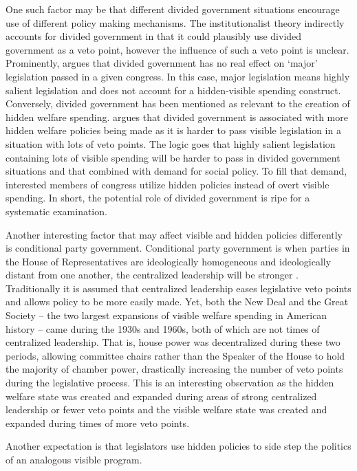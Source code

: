\documentclass[12pt]{article}
\begin{document}
One such factor may be that different divided government situations encourage use of different policy making mechanisms.  The institutionalist theory indirectly accounts for divided government in that it could plausibly use divided government as a veto point, however the influence of such a veto point is unclear. Prominently, \cite{mayhew1990} argues that divided government has no real effect on `major' legislation passed in a given congress. In this case, major legislation means highly salient legislation and does not account for a hidden-visible spending construct. Conversely, divided government has been mentioned as relevant to the creation of hidden welfare spending. \citet[Ch. 4]{howard2008} argues that divided government is associated with more hidden welfare policies being made as it is harder to pass visible legislation in a situation with lots of veto points. The logic goes that highly salient legislation containing lots of visible spending will be harder to pass in divided government situations and that combined with demand for social policy. To fill that demand, interested members of congress utilize hidden policies instead of overt visible spending. In short, the potential role of divided government is ripe for a systematic examination.

Another interesting factor that may affect visible and hidden policies differently is conditional party government. Conditional party government is when parties in the House of Representatives are ideologically homogeneous and ideologically distant from one another, the centralized leadership will be stronger \cite{rohde1991}. Traditionally it is assumed that centralized leadership eases legislative veto points and allows policy to be more easily made. Yet, both the New Deal and the Great Society -- the two largest expansions of visible welfare spending in American history -- came during the 1930s and 1960s, both of which are not times of centralized leadership. That is, house power was decentralized during these two periods, allowing committee chairs rather than the Speaker of the House to hold the majority of chamber power, drastically increasing the number of veto points during the legislative process. This is an interesting observation as the hidden welfare state was created and expanded during areas of strong centralized leadership or fewer veto points and the visible welfare state was created and expanded during times of more veto points.

Another expectation is that legislators use hidden policies to side step the politics of an analogous visible program.
\end{document}

